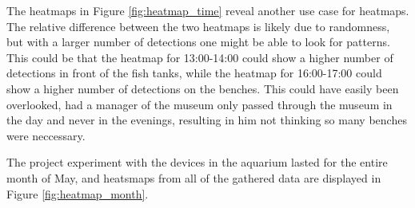 The heatmaps in Figure \ref{fig:heatmap_time} reveal another use case for heatmaps. The relative difference between the two heatmaps is likely due to randomness, but with a larger number of detections one might be able to look for patterns. This could be that the heatmap for 13:00-14:00 could show a higher number of detections in front of the fish tanks, while the heatmap for 16:00-17:00 could show a higher number of detections on the benches. This could have easily been overlooked, had a manager of the museum only passed through the museum in the day and never in the evenings, resulting in him not thinking so many benches were neccessary. 

The project experiment with the devices in the aquarium lasted for the entire month of May, and heatsmaps from all of the gathered data are displayed in Figure \ref{fig:heatmap_month}. 

